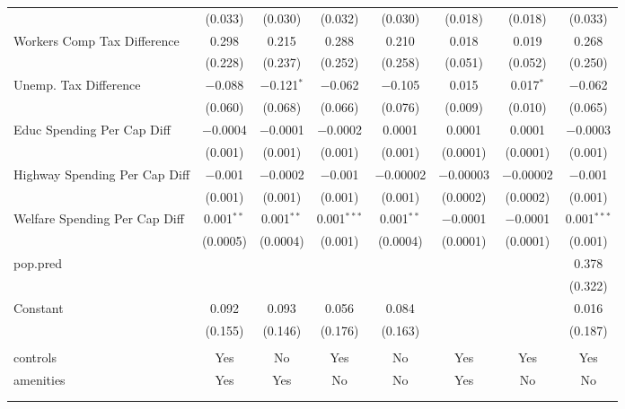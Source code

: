 \begin{table}[!htbp]
\begin{tabular}{@{\extracolsep{5pt}}lccccccc}
  & (0.033) & (0.030) & (0.032) & (0.030) & (0.018) & (0.018) & (0.033) \\ 
  Workers Comp Tax Difference & 0.298 & 0.215 & 0.288 & 0.210 & 0.018 & 0.019 & 0.268 \\ 
  & (0.228) & (0.237) & (0.252) & (0.258) & (0.051) & (0.052) & (0.250) \\ 
  Unemp. Tax Difference & $-$0.088 & $-$0.121$^{*}$ & $-$0.062 & $-$0.105 & 0.015 & 0.017$^{*}$ & $-$0.062 \\ 
  & (0.060) & (0.068) & (0.066) & (0.076) & (0.009) & (0.010) & (0.065) \\ 
  Educ Spending Per Cap Diff & $-$0.0004 & $-$0.0001 & $-$0.0002 & 0.0001 & 0.0001 & 0.0001 & $-$0.0003 \\ 
  & (0.001) & (0.001) & (0.001) & (0.001) & (0.0001) & (0.0001) & (0.001) \\ 
  Highway Spending Per Cap Diff & $-$0.001 & $-$0.0002 & $-$0.001 & $-$0.00002 & $-$0.00003 & $-$0.00002 & $-$0.001 \\ 
  & (0.001) & (0.001) & (0.001) & (0.001) & (0.0002) & (0.0002) & (0.001) \\ 
  Welfare Spending Per Cap Diff & 0.001$^{**}$ & 0.001$^{**}$ & 0.001$^{***}$ & 0.001$^{**}$ & $-$0.0001 & $-$0.0001 & 0.001$^{***}$ \\ 
  & (0.0005) & (0.0004) & (0.001) & (0.0004) & (0.0001) & (0.0001) & (0.001) \\ 
  pop.pred &  &  &  &  &  &  & 0.378 \\ 
  &  &  &  &  &  &  & (0.322) \\ 
  Constant & 0.092 & 0.093 & 0.056 & 0.084 &  &  & 0.016 \\ 
  & (0.155) & (0.146) & (0.176) & (0.163) &  &  & (0.187) \\ 
 \hline \\[-1.8ex] 
controls & Yes & No & Yes & No & Yes & Yes & Yes \\ 
amenities & Yes & Yes & No & No & Yes & No & No \\ 
\hline \\[-1.8ex] 
\hline 
\hline \\[-1.8ex] 
\end{tabular} 
\end{table} 
